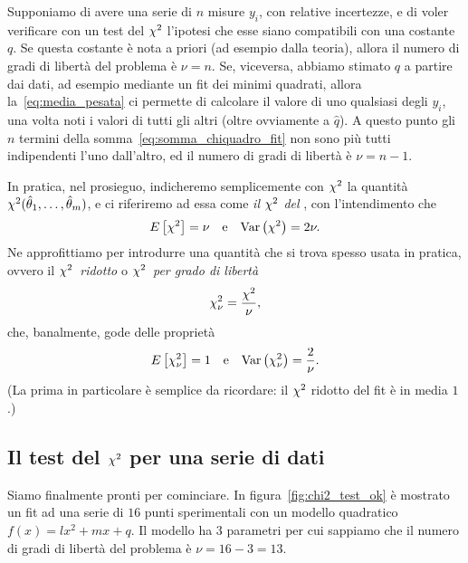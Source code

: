 \begin{examplebox}
  \begin{example}
    Supponiamo di avere una serie di $n$ misure $y_i$, con relative incertezze,
    e di voler verificare con un test del $\chi^2$ l'ipotesi che esse siano
    compatibili con una costante $q$. Se questa costante è nota a priori (ad
    esempio dalla teoria), allora il numero di gradi di libertà del problema
    è $\nu = n$. Se, viceversa, abbiamo stimato $q$ a partire dai dati,
    ad esempio mediante un fit dei minimi quadrati, allora
    la~\eqref{eq:media_pesata} ci permette di calcolare il valore di uno
    qualsiasi degli $y_i$, una volta noti i valori di tutti gli altri (oltre
    ovviamente a $\hat{q}$). A questo punto gli $n$ termini della
    somma~\eqref{eq:somma_chiquadro_fit} non sono più tutti indipendenti
    l'uno dall'altro, ed il numero di gradi di libertà è $\nu = n - 1$.
  \end{example}
\end{examplebox}

In pratica, nel prosieguo, indicheremo semplicemente con $\chi^2$ la quantità $\chisquare{\hat{\theta}_1,\ldots,\hat{\theta}_m}$, e ci riferiremo ad essa come
\emph{il $\chi^2$ del \fit}, con l'intendimento che
\begin{align*}
  \displaystyle E\left[\chi^2\right] = \nu \quad \text{e} \quad \text{Var}\left(\chi^2\right) = 2\nu.
\end{align*}
Ne approfittiamo per introdurre una quantità che si trova spesso usata in
pratica, ovvero il $\chi^2$~\emph{ridotto} o $\chi^2$~\emph{per grado di libertà}
\begin{align}
  \chi^2_\nu = \frac{\chi^2}{\nu},
\end{align}
che, banalmente, gode delle proprietà
\begin{align*}
  \displaystyle E\left[\chi^2_\nu\right] = 1 \quad \text{e} \quad \text{Var}\left(\chi^2_\nu\right) = \frac{2}{\nu}.
\end{align*}
(La prima in particolare è semplice da ricordare: il $\chi^2$ ridotto del
fit è in media $1$.)



\subsection{Il test del \texorpdfstring{$\chi^2$}{chi2} per una serie di dati}
\label{sec:test_chi2_serie}

Siamo finalmente pronti per cominciare. In figura~\ref{fig:chi2_test_ok} è
mostrato un fit ad una serie di $16$ punti sperimentali con un modello
quadratico $f(x) = lx^2 + mx + q$. Il modello ha $3$ parametri per cui sappiamo
che il numero di gradi di libertà del problema è $\nu = 16 - 3 = 13$.

